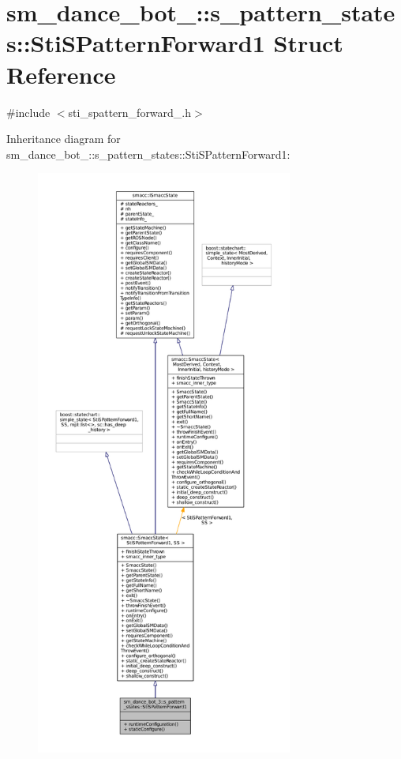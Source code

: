 \hypertarget{structsm__dance__bot__3_1_1s__pattern__states_1_1StiSPatternForward1}{}\section{sm\+\_\+dance\+\_\+bot\+\_\+:\+:s\+\_\+pattern\+\_\+states\+:\+:Sti\+S\+Pattern\+Forward1 Struct Reference}
\label{structsm__dance__bot__3_1_1s__pattern__states_1_1StiSPatternForward1}


{\ttfamily \#include $<$sti\+\_\+spattern\+\_\+forward\+\_.\+h$>$}



Inheritance diagram for sm\+\_\+dance\+\_\+bot\+\_\+:\+:s\+\_\+pattern\+\_\+states\+:\+:Sti\+S\+Pattern\+Forward1\+:
\nopagebreak
\begin{figure}[H]
\begin{center}
\leavevmode
\includegraphics[height=550pt]{structsm__dance__bot__3_1_1s__pattern__states_1_1StiSPatternForward1__inherit__graph}
\end{center}
\end{figure}


